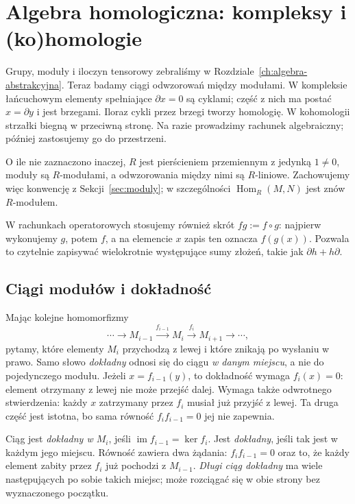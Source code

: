 \chapter{Algebra homologiczna: kompleksy i (ko)homologie}
\label{ch:algebra-homologiczna}

\providecommand{\atlasref}[2]{#2}

Grupy, moduły i iloczyn tensorowy zebraliśmy w
Rozdziale~\ref{ch:algebra-abstrakcyjna}.
Teraz badamy ciągi odwzorowań między modułami.
W kompleksie łańcuchowym elementy spełniające
$\partial x=0$ są cyklami; część z nich ma postać
$x=\partial y$ i jest brzegami. Iloraz cykli
przez brzegi tworzy homologię. W kohomologii
strzałki biegną w przeciwną stronę.
Na razie prowadzimy rachunek algebraiczny;
później zastosujemy go do przestrzeni.

O ile nie zaznaczono inaczej, $R$ jest pierścieniem przemiennym
z jedynką $1\ne0$, moduły są $R$-modułami, a odwzorowania między
nimi są $R$-liniowe. Zachowujemy więc konwencję z
Sekcji~\ref{sec:moduly}; w szczególności
$\operatorname{Hom}_R(M,N)$ jest znów $R$-modułem.

W rachunkach operatorowych stosujemy również skrót
$fg:=f\circ g$: najpierw wykonujemy $g$, potem $f$,
a na elemencie $x$ zapis ten oznacza $f(g(x))$.
Pozwala to czytelnie zapisywać wielokrotnie występujące sumy
złożeń, takie jak $\partial h+h\partial$.

\section{Ciągi modułów i dokładność}
\label{sec:dokladnosc-modulow}

Mając kolejne homomorfizmy
\[
 \cdots\longrightarrow M_{i-1}
 \xrightarrow{f_{i-1}}M_i
 \xrightarrow{f_i}M_{i+1}
 \longrightarrow\cdots,
\]
pytamy, które elementy $M_i$ przychodzą z lewej
i które znikają po wysłaniu w prawo.
Samo słowo \emph{dokładny} odnosi się do
ciągu \emph{w danym miejscu}, a nie do
pojedynczego modułu.
Jeżeli $x=f_{i-1}(y)$, to dokładność wymaga
$f_i(x)=0$: element otrzymany z lewej nie może
przejść dalej. Wymaga także odwrotnego stwierdzenia:
każdy $x$ zatrzymany przez $f_i$ musiał już
przyjść z lewej. Ta druga część jest istotna,
bo sama równość $f_i f_{i-1}=0$ jej nie zapewnia.

\begin{definicja}
\label{def:ciag-dokladny}
Ciąg jest \emph{dokładny w $M_i$}, jeśli
$\operatorname{im}f_{i-1}=\ker f_i$.
Jest \emph{dokładny}, jeśli tak jest
w każdym jego miejscu. Równość zawiera
dwa żądania: $f_i f_{i-1}=0$ oraz to,
że każdy element zabity przez $f_i$
już pochodzi z $M_{i-1}$.
\emph{Długi ciąg dokładny} ma wiele
następujących po sobie takich miejsc;
może rozciągać się w obie strony
bez wyznaczonego początku.
\end{definicja}

